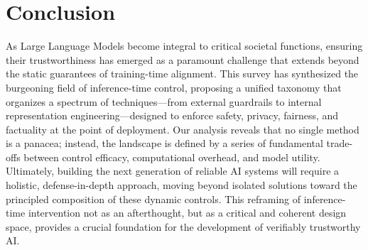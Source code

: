 \section{Conclusion}
\label{sec:conclusion}

As Large Language Models become integral to critical societal functions, ensuring their trustworthiness has emerged as a paramount challenge that extends beyond the static guarantees of training-time alignment. This survey has synthesized the burgeoning field of inference-time control, proposing a unified taxonomy that organizes a spectrum of techniques—from external guardrails to internal representation engineering—designed to enforce safety, privacy, fairness, and factuality at the point of deployment. Our analysis reveals that no single method is a panacea; instead, the landscape is defined by a series of fundamental trade-offs between control efficacy, computational overhead, and model utility. Ultimately, building the next generation of reliable AI systems will require a holistic, defense-in-depth approach, moving beyond isolated solutions toward the principled composition of these dynamic controls. This reframing of inference-time intervention not as an afterthought, but as a critical and coherent design space, provides a crucial foundation for the development of verifiably trustworthy AI.